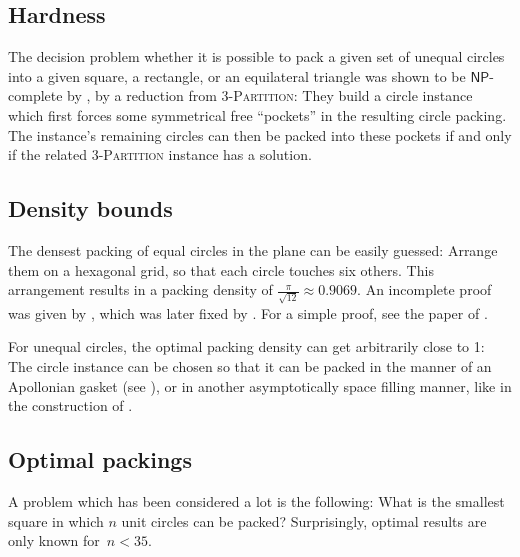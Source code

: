 \documentclass[a4paper,style=print,bibliography=totoc,nexus,lnum,extramargin]{tubsbook}
\begin{document}

\subsection{Hardness}

The decision problem whether it is possible to pack a given set of unequal circles into a given square, a rectangle, or an equilateral triangle was shown to be $\mathsf{NP}$-complete by \textcite{DFL2010circle}, by a reduction from \textsc{3-Partition}: They build a circle instance which first forces some symmetrical free “pockets” in the resulting circle packing. The instance's remaining circles can then be packed into these pockets if and only if the related \textsc{3-Partition} instance has a solution.

\subsection{Density bounds}

The densest packing of equal circles in the plane can be easily guessed: Arrange them on a hexagonal grid, so that each circle touches six others. This arrangement results in a packing density of $\frac{\pi}{\sqrt{12}} \approx 0.9069$. An incomplete proof was given by \textcite{thue1892om}, which was later fixed by \textcite{fejestoth1940uber}. For a simple proof, see the paper of \textcite{CW2010simple}.

For unequal circles, the optimal packing density can get arbitrarily close to 1: The circle instance can be chosen so that it can be packed in the manner of an Apollonian gasket (see ), or in another asymptotically space filling manner, like in the construction of \textcite{bourke2011random}.


\subsection{Optimal packings}

A problem which has been considered a lot is the following: What is the smallest square in which $n$ unit circles can be packed?
Surprisingly, optimal results are only known for~$n < 35$.
\end{document}
